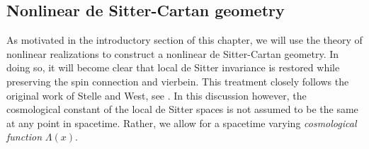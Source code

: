 \documentclass[11pt]{article}
\begin{document}
\subsection{Nonlinear de Sitter-Cartan geometry}
\label{ssec:nonlin_dSC_geom}

As motivated in the introductory section of this chapter, we will 
use the theory of nonlinear realizations to construct a nonlinear 
de Sitter-Cartan geometry. In doing so, it will become clear that 
local de Sitter invariance is restored while preserving the spin 
connection and vierbein.
This treatment closely follows the original work of Stelle and 
West, see \cite{Stelle:1979va,stelle.west:1980ds}. In this 
discussion however, the cosmological constant of the local de 
Sitter spaces is not assumed to be the same at any point in 
spacetime. Rather, we allow for a spacetime varying 
\emph{cosmological function} $\Lambda(x)$.
\end{document}
